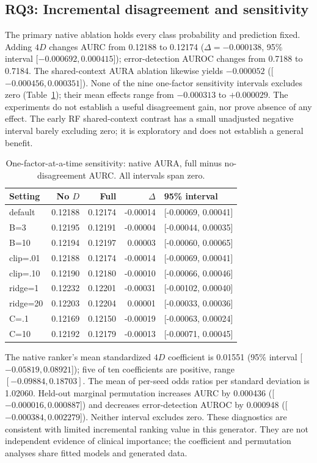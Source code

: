 \documentclass[conference]{IEEEtran}
\begin{document}
\subsection{RQ3: Incremental disagreement and sensitivity}
The primary native ablation holds every class probability and prediction fixed. Adding $4D$ changes AURC from 0.12188 to 0.12174 ($\Delta=-0.000138$, 95\% interval [$-0.000692,0.000415$]); error-detection AUROC changes from 0.7188 to 0.7184. The shared-context AURA ablation likewise yields $-0.000052$ ([$-0.000456,0.000351$]). None of the nine one-factor sensitivity intervals excludes zero (Table~\ref{tab:sens}); their mean effects range from $-0.000313$ to $+0.000029$. The experiments do not establish a useful disagreement gain, nor prove absence of any effect. The early RF shared-context contrast has a small unadjusted negative interval barely excluding zero; it is exploratory and does not establish a general benefit.
\begin{table}[t]
\caption{One-factor-at-a-time sensitivity: native AURA, full minus no-disagreement AURC. All intervals span zero.}
\label{tab:sens}
\centering\footnotesize
\begin{tabular}{@{}lrrrl@{}}\toprule
Setting & No $D$ & Full & $\Delta$ & 95\% interval\\\midrule
default & 0.12188 & 0.12174 & -0.00014 & [-0.00069, 0.00041]\\
B=3 & 0.12195 & 0.12191 & -0.00004 & [-0.00044, 0.00035]\\
B=10 & 0.12194 & 0.12197 & 0.00003 & [-0.00060, 0.00065]\\
clip=.01 & 0.12188 & 0.12174 & -0.00014 & [-0.00069, 0.00041]\\
clip=.10 & 0.12190 & 0.12180 & -0.00010 & [-0.00066, 0.00046]\\
ridge=1 & 0.12232 & 0.12201 & -0.00031 & [-0.00102, 0.00040]\\
ridge=20 & 0.12203 & 0.12204 & 0.00001 & [-0.00033, 0.00036]\\
C=.1 & 0.12169 & 0.12150 & -0.00019 & [-0.00063, 0.00024]\\
C=10 & 0.12192 & 0.12179 & -0.00013 & [-0.00071, 0.00045]\\\bottomrule
\end{tabular}
\end{table}
The native ranker's mean standardized $4D$ coefficient is 0.01551 (95\% interval [$-0.05819,0.08921$]); five of ten coefficients are positive, range $[-0.09884,0.18703]$. The mean of per-seed odds ratios per standard deviation is 1.02060. Held-out marginal permutation increases AURC by 0.000436 ([$-0.000016,0.000887$]) and decreases error-detection AUROC by 0.000948 ([$-0.000384,0.002279$]). Neither interval excludes zero. These diagnostics are consistent with limited incremental ranking value in this generator. They are not independent evidence of clinical importance; the coefficient and permutation analyses share fitted models and generated data.
\end{document}
